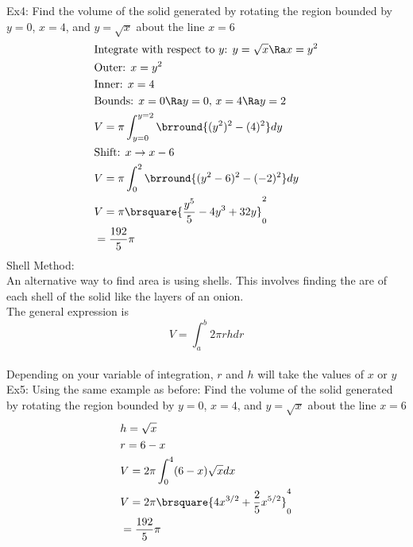 Ex4: Find the volume of the solid generated by rotating the region bounded by $y=0$, $x=4$, and $y=\sqrt{x}$ about the line $x=6$
\begin{align*}
    &\text{Integrate with respect to $y$: }y=\sqrt{x}\Ra x=y^2\\
    &\text{Outer: }x=y^2\\
    &\text{Inner: }x=4\\
    &\text{Bounds: }x=0\Ra y=0,\,x=4\Ra y=2\\
    &V=\pi\int_{y=0}^{y=2}\brround{(y^2)^2-(4)^2}dy\\
    &\text{Shift: }x\to x-6\\
    &V=\pi\int_0^2\brround{(y^2-6)^2-(-2)^2}dy\\
    &V=\pi\brsquare{\frac{y^5}{5}-4y^3+32y}_0^2\\
    &=\frac{192}{5}\pi
\end{align*}
Shell Method:\\
An alternative way to find area is using shells. This involves finding the are of each shell of the solid like the layers of an onion.\\
The general expression is
$$V=\int_a^b2\pi rhdr$$\\
Depending on your variable of integration, $r$ and $h$ will take the values of $x$ or $y$\\
Ex5: Using the same example as before: Find the volume of the solid generated by rotating the region bounded by $y=0$, $x=4$, and $y=\sqrt{x}$ about the line $x=6$
\begin{align*}
    &h=\sqrt{x}\\
    &r=6-x\\
    &V=2\pi\int_0^4(6-x)\sqrt{x}dx\\
    &V=2\pi\brsquare{4x^{3/2}+\frac{2}{5}x^{5/2}}_0^4\\
    &=\frac{192}{5}\pi
\end{align*}


